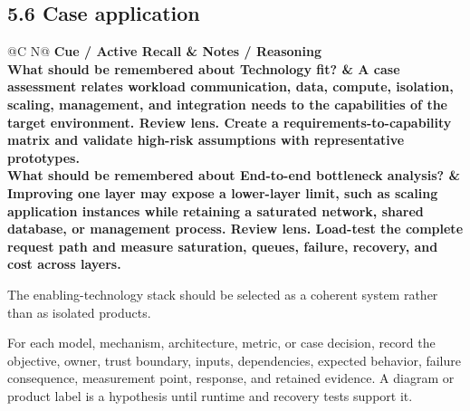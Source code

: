 \documentclass[11pt]{article}
\newcommand{\CornellHeader}{\rowcolor{Navy}\color{white}\bfseries Cue / Active Recall & \color{white}\bfseries Notes / Reasoning \\\endhead}
\newcommand{\CornellRow}[2]{\cellcolor{CueGray}\textbf{#1} & #2 \\\addlinespace[3pt]}
\begin{document}
\subsection{5.6 Case application}
\begin{longtable}{@{}C N@{}}
\CornellHeader
\CornellRow{What should be remembered about Technology fit?}{A case assessment relates workload communication, data, compute, isolation, scaling, management, and integration needs to the capabilities of the target environment. \textbf{Review lens.} Create a requirements-to-capability matrix and validate high-risk assumptions with representative prototypes.}
\CornellRow{What should be remembered about End-to-end bottleneck analysis?}{Improving one layer may expose a lower-layer limit, such as scaling application instances while retaining a saturated network, shared database, or management process. \textbf{Review lens.} Load-test the complete request path and measure saturation, queues, failure, recovery, and cost across layers.}
\end{longtable}
\begin{sectionsummarybox}
The enabling-technology stack should be selected as a coherent system rather than as isolated products.
\end{sectionsummarybox}
\begin{practicebox}
For each model, mechanism, architecture, metric, or case decision, record the objective, owner, trust boundary, inputs, dependencies, expected behavior, failure consequence, measurement point, response, and retained evidence. A diagram or product label is a hypothesis until runtime and recovery tests support it.
\end{practicebox}
\end{document}
